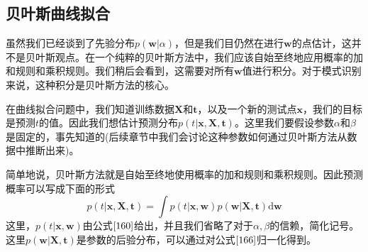 \subsection*{贝叶斯曲线拟合}
虽然我们已经谈到了先验分布$p(\boldsymbol{w}|\alpha)$，但是我们目仍然在进行$\boldsymbol{w}$的点估计，这并不是贝叶斯观点。在一个纯粹的贝叶斯方法中，我们应该自始至终地应用概率的加和规则和乘积规则。我们稍后会看到，这需要对所有$\boldsymbol{w}$值进行积分。对于模式识别来说，这种积分是贝叶斯方法的核心。

在曲线拟合问题中，我们知道训练数据$\boldsymbol{X}$和$\boldsymbol{t}$，以及一个新的测试点$\boldsymbol{x}$，我们的目标是预测$t$的值。因此我们想估计预测分布$p(t|\boldsymbol{x},\boldsymbol{X},\boldsymbol{t})$。这里我们要假设参数$\alpha$和$\beta$是固定的，事先知道的(后续章节中我们会讨论这种参数如何通过贝叶斯方法从数据中推断出来)。

简单地说，贝叶斯方法就是自始至终地使用概率的加和规则和乘积规则。因此预测概率可以写成下面的形式
\begin{equation}
	p(t|\boldsymbol{x},\boldsymbol{X},\boldsymbol{t})=\int p(t|\boldsymbol{x},\boldsymbol{w})p(\boldsymbol{w}|\boldsymbol{X},\boldsymbol{t})\mathrm{d}\boldsymbol{w}
\end{equation}
这里，$p(t|\boldsymbol{x},\boldsymbol{w})$由公式$\ref{160}$给出，并且我们省略了对于$\alpha,\beta$的信赖，简化记号。这里$p(\boldsymbol{w}|\boldsymbol{X},\boldsymbol{t})$是参数的后验分布，可以通过对公式$\ref{166}$归一化得到。